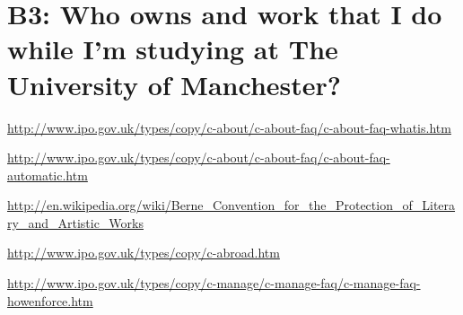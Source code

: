 \documentclass{article}
\begin{document}
\section{B3: Who owns and work that I do while I'm studying at The University of Manchester?}

\begin{thebibliography}{9}

  \url{http://www.ipo.gov.uk/types/copy/c-about/c-about-faq/c-about-faq-whatis.htm}

  \url{http://www.ipo.gov.uk/types/copy/c-about/c-about-faq/c-about-faq-automatic.htm}

  \url{http://en.wikipedia.org/wiki/Berne_Convention_for_the_Protection_of_Literary_and_Artistic_Works}

  \url{http://www.ipo.gov.uk/types/copy/c-abroad.htm}

  \url{http://www.ipo.gov.uk/types/copy/c-manage/c-manage-faq/c-manage-faq-howenforce.htm}

\end{thebibliography}
\end{document}
